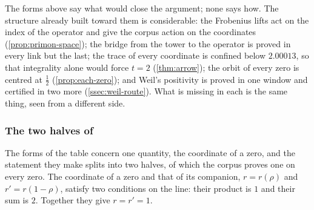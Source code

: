 The forms above say what would close the argument; none says how.  The structure already
built toward them is considerable: the Frobenius lifts act on the index of the operator and
give the corpus action on the coordinates (\cref{prop:primon-space}); the bridge from the
tower to the operator is proved in every link but the last; the trace of every coordinate is
confined below $2.00013$, so that integrality alone would force $t=2$ (\cref{thm:arrow}); the
orbit of every zero is centred at $\tfrac12$ (\cref{prop:each-zero}); and Weil's positivity
is proved in one window and certified in two more (\cref{ssec:weil-route}).  What is missing in each is the same thing,
seen from a different side.

\subsubsection{The two halves of \Ecore}\label{ssec:two-halves}

The forms of the table concern one quantity, the coordinate of a zero, and the statement they make splits into two halves, of which the corpus proves one on every zero.  The coordinate of a zero and that of its companion, $r=r(\rho)$ and $r'=r(1-\rho)$, satisfy two conditions on the line: their product is $1$ and their sum is $2$.  Together they give $r=r'=1$.


